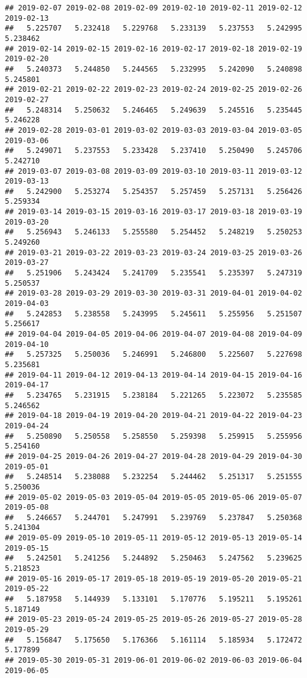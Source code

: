 \documentclass[
]{article}
\begin{document}
\begin{verbatim}
## 2019-02-07 2019-02-08 2019-02-09 2019-02-10 2019-02-11 2019-02-12 2019-02-13 
##   5.225707   5.232418   5.229768   5.233139   5.237553   5.242995   5.238462 
## 2019-02-14 2019-02-15 2019-02-16 2019-02-17 2019-02-18 2019-02-19 2019-02-20 
##   5.240373   5.244850   5.244565   5.232995   5.242090   5.240898   5.245801 
## 2019-02-21 2019-02-22 2019-02-23 2019-02-24 2019-02-25 2019-02-26 2019-02-27 
##   5.248314   5.250632   5.246465   5.249639   5.245516   5.235445   5.246228 
## 2019-02-28 2019-03-01 2019-03-02 2019-03-03 2019-03-04 2019-03-05 2019-03-06 
##   5.249071   5.237553   5.233428   5.237410   5.250490   5.245706   5.242710 
## 2019-03-07 2019-03-08 2019-03-09 2019-03-10 2019-03-11 2019-03-12 2019-03-13 
##   5.242900   5.253274   5.254357   5.257459   5.257131   5.256426   5.259334 
## 2019-03-14 2019-03-15 2019-03-16 2019-03-17 2019-03-18 2019-03-19 2019-03-20 
##   5.256943   5.246133   5.255580   5.254452   5.248219   5.250253   5.249260 
## 2019-03-21 2019-03-22 2019-03-23 2019-03-24 2019-03-25 2019-03-26 2019-03-27 
##   5.251906   5.243424   5.241709   5.235541   5.235397   5.247319   5.250537 
## 2019-03-28 2019-03-29 2019-03-30 2019-03-31 2019-04-01 2019-04-02 2019-04-03 
##   5.242853   5.238558   5.243995   5.245611   5.255956   5.251507   5.256617 
## 2019-04-04 2019-04-05 2019-04-06 2019-04-07 2019-04-08 2019-04-09 2019-04-10 
##   5.257325   5.250036   5.246991   5.246800   5.225607   5.227698   5.235681 
## 2019-04-11 2019-04-12 2019-04-13 2019-04-14 2019-04-15 2019-04-16 2019-04-17 
##   5.234765   5.231915   5.238184   5.221265   5.223072   5.235585   5.246562 
## 2019-04-18 2019-04-19 2019-04-20 2019-04-21 2019-04-22 2019-04-23 2019-04-24 
##   5.250890   5.250558   5.258550   5.259398   5.259915   5.255956   5.254160 
## 2019-04-25 2019-04-26 2019-04-27 2019-04-28 2019-04-29 2019-04-30 2019-05-01 
##   5.248514   5.238088   5.232254   5.244462   5.251317   5.251555   5.250036 
## 2019-05-02 2019-05-03 2019-05-04 2019-05-05 2019-05-06 2019-05-07 2019-05-08 
##   5.246657   5.244701   5.247991   5.239769   5.237847   5.250368   5.241304 
## 2019-05-09 2019-05-10 2019-05-11 2019-05-12 2019-05-13 2019-05-14 2019-05-15 
##   5.242501   5.241256   5.244892   5.250463   5.247562   5.239625   5.218523 
## 2019-05-16 2019-05-17 2019-05-18 2019-05-19 2019-05-20 2019-05-21 2019-05-22 
##   5.187958   5.144939   5.133101   5.170776   5.195211   5.195261   5.187149 
## 2019-05-23 2019-05-24 2019-05-25 2019-05-26 2019-05-27 2019-05-28 2019-05-29 
##   5.156847   5.175650   5.176366   5.161114   5.185934   5.172472   5.177899 
## 2019-05-30 2019-05-31 2019-06-01 2019-06-02 2019-06-03 2019-06-04 2019-06-05 

\end{verbatim}
\end{document}
